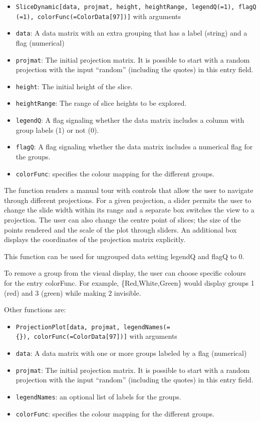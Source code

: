 \documentclass[]{interact}
\theoremstyle{plain}%
\theoremstyle{definition}
\theoremstyle{remark}
\begin{document}
\begin{itemize}
\item
  \texttt{SliceDynamic{[}data,\ projmat,\ height,\ heightRange,\ legendQ(=1),\ flagQ(=1),\ colorFunc(=ColorData{[}97{]}){]}}
  with arguments
\item
  \texttt{data}: A data matrix with an extra grouping that has a label
  (string) and a flag (numerical)
\item
  \texttt{projmat}: The initial projection matrix. It is possible to
  start with a random projection with the input ``random'' (including
  the quotes) in this entry field.
\item
  \texttt{height}: The initial height of the slice.
\item
  \texttt{heightRange}: The range of slice heights to be explored.
\item
  \texttt{legendQ}: A flag signaling whether the data matrix includes a
  column with group labels (1) or not (0).
\item
  \texttt{flagQ}: A flag signaling whether the data matrix includes a
  numerical flag for the groups.
\item
  \texttt{colorFunc}: specifies the colour mapping for the different
  groups.
\end{itemize}

The function renders a manual tour with controls that allow the user to
navigate through different projections. For a given projection, a slider
permits the user to change the slide width within its range and a
separate box switches the view to a projection. The user can also change
the centre point of slices; the size of the points rendered and the
scale of the plot through sliders. An additional box displays the
coordinates of the projection matrix explicitly.

This function can be used for ungrouped data setting legendQ and flagQ
to 0.

To remove a group from the visual display, the user can choose specific
colours for the entry colorFunc. For example, \{Red,White,Green\} would
display groups 1 (red) and 3 (green) while making 2 invisible.

Other functions are:

\begin{itemize}
\item
  \texttt{ProjectionPlot{[}data,\ projmat,\ legendNames(=\{\}),\ colorFunc(=ColorData{[}97{]}){]}}
  with arguments
\item
  \texttt{data}: A data matrix with one or more groups labeled by a flag
  (numerical)
\item
  \texttt{projmat}: The initial projection matrix. It is possible to
  start with a random projection with the input ``random'' (including
  the quotes) in this entry field.
\item
  \texttt{legendNames}: an optional list of labels for the groups.
\item
  \texttt{colorFunc}: specifies the colour mapping for the different
  groups.
\end{itemize}
\end{document}

